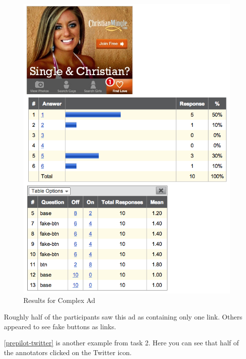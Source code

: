 \begin{figure}
\centerline{
\includegraphics[scale=.3]{chapter6.tex/example1-annotated}
}
\caption{Results for Complex Ad}
\label{complex-result}
\end{figure}

Roughly half of the participants saw this ad as containing only one link. Others appeared to see fake buttons as links.

 \autoref{prepilot-twitter}  is another example from task 2. Here you can see that half of the annotators clicked on the Twitter icon.


